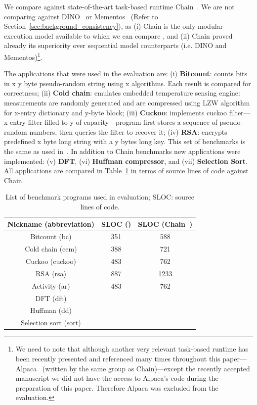 We compare \sys against state-of-the-art task-based runtime Chain~\cite{chain}. We are not comparing \sys against DINO~\cite{dino} or Mementos~\cite{mementos} (Refer to Section~\ref{sec:background_consistency}), as (i) Chain is the only modular execution model available to which we can compare \sys, and (ii) Chain proved already its superiority over sequential model counterparts (i.e. DINO and Mementos)\footnote{We need to note that although another very relevant task-based runtime has been recently presented and referenced many times throughout this paper---Alpaca~\cite{alpaca} (written by the same group as Chain)---except the recently accepted manuscript we did not have the access to Alpaca's code during the preparation of this paper. Therefore Alpaca was excluded from the evaluation.}.

The applications that were used in the evaluation are: (i) \textbf{Bitcount}: counts bits in x y byte pseudo-random string using x algorithms. Each result is compared for correctness; (ii) \textbf{Cold chain}: emulates embedded temperature sensing engine: measurements are randomly generated and are compressed using LZW algorithm for x-entry dictionary and y-byte block; (iii) \textbf{Cuckoo}: implements cuckoo filter---x entry filter filled to y of capacity---program first stores a sequence of pseudo-random numbers, then queries the filter to recover it; (iv) \textbf{RSA}: encrypts predefined x byte long string with a y bytes long key. This set of benchmarks is the same as used in~\cite{chain,alpaca}. In addition to Chain benchmarks new applications were implemented: (v) \textbf{DFT}, (vi) \textbf{Huffman compressor}, and (vii) \textbf{Selection Sort}. All applications are compared in Table~\ref{table:benchmark_list} in terms of source lines of code against Chain. 

\begin{table}[t]
	\centering
	\footnotesize
	\begin{tabular}{|c|c|c|}
		\hline
		Nickname (abbreviation) & SLOC (\sys) & SLOC (Chain~\cite{chain})\\
		\hline\hline
		Bitcount (bc) & 351 & 588 \\ %
		Cold chain (cem) & 388 & 721 \\ %
		Cuckoo (cuckoo) & 483 & 762 \\ %
		RSA (rsa) & 887 & 1233 \\ %
		Activity (ar) & 483 & 762 \\ %
		DFT (dft) & {} & {} \\ %
		Huffman (dd) & {} & {} \\ %
		Selection sort (sort) & {} & {} \\
		\hline
	\end{tabular}
\caption{List of benchmark programs used in \sys evaluation; SLOC: source lines of code.}
\label{table:benchmark_list}
\end{table}


